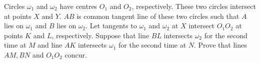 Circles $\omega_1$ and $\omega_2$ have centres $O_1$ and $O_2$,  respectively. These two circles intersect at points $X$ and $Y$. $AB$ is common tangent line of these two circles such that $A$ lies on $\omega_1$ and $B$ lies on $\omega_2$. Let tangents to $\omega_1$ and $\omega_2$ at $X$ intersect $O_1O_2$ at points $K$ and $L$,  respectively. Suppose that line $BL$ intersects $\omega_2$ for the second time at $M$ and line $AK$ intersects $\omega_1$ for the second time at $N$. Prove that lines $AM, BN$ and $O_1O_2$ concur.
